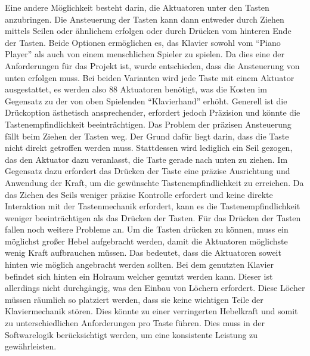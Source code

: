 Eine andere Möglichkeit besteht darin, die Aktuatoren unter den Tasten anzubringen.
Die Ansteuerung der Tasten kann dann entweder durch Ziehen mittels
Seilen oder ähnlichem erfolgen oder durch Drücken vom hinteren Ende der Tasten. Beide Optionen ermöglichen es, das Klavier sowohl vom \enquote{Piano Player} %
als auch von einem menschlichen Spieler zu spielen. Da dies eine der Anforderungen für das Projekt ist,
wurde entschieden, dass die Ansteuerung von unten erfolgen muss. Bei beiden Varianten wird jede Taste mit einem Aktuator
ausgestattet, es werden also 88 Aktuatoren benötigt, was die Kosten im Gegensatz zu der von oben Spielenden \enquote{Klavierhand}
erhöht.
Generell ist die Drückoption ästhetisch ansprechender, erfordert jedoch Präzision und könnte die
Tastenempfindlichkeit beeinträchtigen. Das Problem der präzisen Ansteuerung fällt beim Ziehen der Tasten weg. %
Der Grund dafür liegt darin, dass die Taste nicht
direkt getroffen werden muss. Stattdessen wird lediglich ein Seil gezogen, das den Aktuator dazu veranlasst, die Taste
gerade nach unten zu ziehen. Im Gegensatz dazu erfordert das Drücken der Taste eine präzise Ausrichtung und Anwendung der
Kraft, um die gewünschte Tastenempfindlichkeit zu erreichen. Da das Ziehen des Seils weniger präzise Kontrolle erfordert
und keine direkte Interaktion mit der Tastenmechanik erfordert, kann es die Tastenempfindlichkeit weniger beeinträchtigen
als das Drücken der Tasten.\newline
Für das Drücken der Tasten fallen noch weitere Probleme an. Um die Tasten drücken zu können, muss ein möglichst großer
Hebel aufgebracht werden, damit die Aktuatoren möglichste wenig Kraft aufbrauchen müssen. Das bedeutet, dass
die Aktuatoren soweit hinten wie möglich angebracht werden sollten.\newline
Bei dem genutzten Klavier befindet sich hinten ein Holraum welcher genutzt werden kann. Dieser ist allerdings
nicht durchgängig, was den
Einbau von Löchern erfordert. Diese Löcher müssen räumlich so platziert werden, dass sie keine wichtigen Teile der
Klaviermechanik stören. Dies könnte zu einer verringerten Hebelkraft und somit zu unterschiedlichen Anforderungen pro
Taste führen. Dies muss in der Softwarelogik berücksichtigt werden, um eine konsistente Leistung zu gewährleisten.


